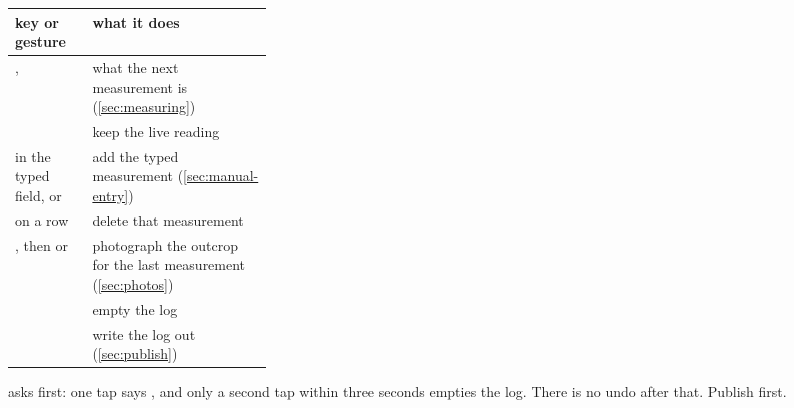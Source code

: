 \begin{center}\small
\begin{tabularx}{\linewidth}{@{}>{\raggedright}p{0.3\linewidth}L@{}}\toprule
\sffamily\bfseries key or gesture & \sffamily\bfseries what it does \\\midrule
{},  & what the next measurement is (\cref{sec:measuring}) \\
 & keep the live reading \\
 in the typed field, or  & add the typed measurement (\cref{sec:manual-entry}) \\
 on a row & delete that measurement \\
, then  or  & photograph the outcrop for the last measurement (\cref{sec:photos}) \\
 & empty the log \\
 & write the log out (\cref{sec:publish}) \\
\bottomrule\end{tabularx}
\end{center}

\begin{caution}
 asks first: one tap says , and only a second tap within
three seconds empties the log. There is no undo after that. Publish first.
\end{caution}
